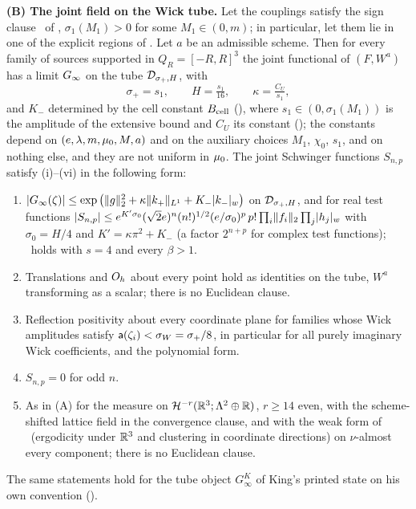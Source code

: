 \begin{theorem}
\medskip\noindent\textbf{(B) The joint field on the Wick tube.} Let the couplings satisfy the sign clause
\Tthree\ of , $\sigma_1(M_1)>0$ for some $M_1\in(0,m)$; in particular, let them lie in
one of the explicit regions of . Let $a$ be an admissible scheme. Then for every
family of sources supported in $Q_R=[-R,R]^3$ the joint functional of $(F,W^a)$ has a limit $G_\infty$ on
the tube $\mathcal D_{\sigma_+,H}$, with
\[
\sigma_+=s_1,\qquad H=\tfrac{s_1}{16},\qquad \kappa=\tfrac{C_U}{s_1},
\]
and $K_-$ determined by the cell constant $B_{\rm cell}$ (), where
$s_1\in(0,\sigma_1(M_1))$ is the amplitude of the extensive bound and $C_U$ its constant
(); the constants depend on $(e,\lambda,m,\mu_0,M,a)$ and on the auxiliary choices $M_1$,
$\chi_0$, $s_1$, and on nothing else, and they are not uniform in $\mu_0$. The joint Schwinger functions
$S_{n,p}$ satisfy \textup{(i)--(vi)} in the following form:
\begin{enumerate}[label=\textup{(\roman*)},leftmargin=*]
\item $\lvert G_\infty(\zeta)\rvert\le\exp\big(\lVert g\rVert_2^2+\kappa\lVert k_+\rVert_{L^1}+K_-\lvert k_-\rvert_{w}\big)$ on
$\mathcal D_{\sigma_+,H}$, and for real test functions
$\lvert S_{n,p}\rvert\le e^{K'\sigma_0}(\sqrt2e)^n(n!)^{1/2}(e/\sigma_0)^p\,p!\prod_i\lVert f_i\rVert_2\prod_j\lvert h_j\rvert_{w}$
with $\sigma_0=H/4$ and $K'=\kappa\pi^2+K_-$ (a factor $2^{n+p}$ for complex test functions); \Ezz\ holds
with $s=4$ and every $\beta>1$.
\item Translations and $O_h$ about every point hold as identities on the tube, $W^a$ transforming as a
scalar; there is no Euclidean clause.
\item Reflection positivity about every coordinate plane for families whose Wick amplitudes satisfy
$\mathsf a(\zeta_i)<\sigma_W=\sigma_+/8$, in particular for all purely imaginary Wick coefficients, and the
polynomial form.
\item $S_{n,p}=0$ for odd $n$.
\item[\textup{(v), (vi)}] As in \textup{(A)} for the measure on $\mathcal H^{-r}(\mathbb R^3;\Lambda^2\oplus\mathbb R)$,
$r\ge14$ even, with the scheme-shifted lattice field in the convergence clause, and with the weak form of
\OSf\ (ergodicity under $\mathbb R^3$ and clustering in coordinate directions) on $\nu$-almost every component;
there is no Euclidean clause.
\end{enumerate}
The same statements hold for the tube object $G^K_\infty$ of King's printed state on his own convention
().
\end{theorem}

